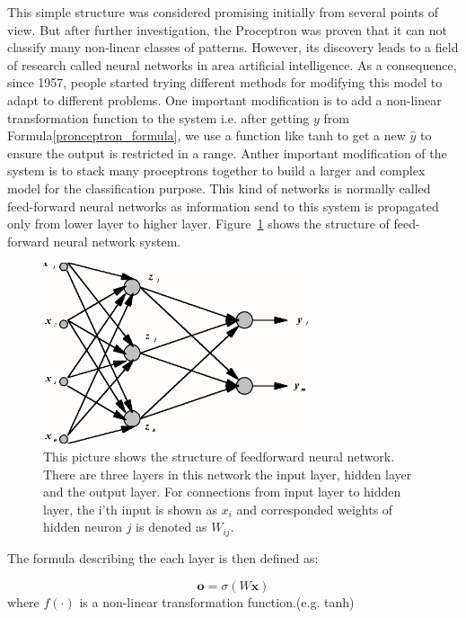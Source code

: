 \documentclass[officiallayout]{tktla}
\begin{document}
This simple structure was considered promising initially from several points of view. But after further investigation, the Proceptron was proven that it can not classify many non-linear classes of patterns. However, its discovery leads to a field of research called neural networks in area artificial intelligence. As a consequence, since 1957, people started trying different methods for modifying this model to adapt to different problems. One important modification is to add a non-linear transformation function to the system i.e. after getting $y$ from Formula\ref{pronceptron_formula}, we use a function like tanh to get a new $\hat{y}$ to ensure the output is restricted in a range. Anther important modification of the system is to stack many proceptrons together to build a larger and complex model for the classification purpose. This kind of networks is normally called feed-forward neural networks as information send to this system is propagated only from lower layer to higher layer. Figure~\ref{feedforward_nn} shows the structure of feed-forward neural network system.

\begin{figure}[h!]
  \centering
    \includegraphics[width=0.7\textwidth]{feedforward_nn}
  \caption{This picture shows the structure of feedforward neural network. There are three layers in this network the input layer, hidden layer and the output layer. For connections from input layer to hidden layer, the i'th input is shown as $x_i$ and corresponded weights of hidden neuron $j$ is denoted as $W_{ij}$.}\label{feedforward_nn}
\end{figure}

The formula describing the each layer is then defined as:

\begin{equation}
\mathbf{o} = \sigma(W\mathbf{x})
\end{equation}
where $f(\cdot)$ is a non-linear transformation function.(e.g. tanh)
\end{document}
